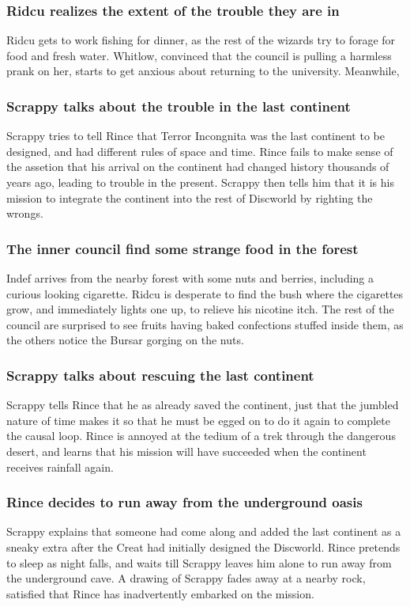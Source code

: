 \subsubsection{\Gls{Ridcu} realizes the extent of the trouble they are in}
\Gls{Ridcu} gets to work fishing for dinner, as the rest of the wizards try to forage for food and
fresh water. \Gls{Whitlow}, convinced that the council is pulling a harmless prank on her, starts to
get anxious about returning to the university. Meanwhile,

\subsubsection{\Gls{Scrappy} talks about the trouble in the last continent}
\Gls{Scrappy} tries to tell \Gls{Rince} that Terror Incongnita was the last continent to be
designed, and had different rules of space and time. \Gls{Rince} fails to make sense of the assetion
that his arrival on the continent had changed history thousands of years ago, leading to trouble in
the present. \Gls{Scrappy} then tells him that it is his mission to integrate the continent into the
rest of Discworld by righting the wrongs.

\subsubsection{The inner council find some strange food in the forest}
\Gls{Indef} arrives from the nearby forest with some nuts and berries, including a curious looking
cigarette. \Gls{Ridcu} is desperate to find the bush where the cigarettes grow, and immediately
lights one up, to relieve his nicotine itch. The rest of the council are surprised to see fruits
having baked confections stuffed inside them, as the others notice the \Gls{Bursar} gorging on the
nuts.

\subsubsection{\Gls{Scrappy} talks about rescuing the last continent}
\Gls{Scrappy} tells \Gls{Rince} that he as already saved the continent, just that the jumbled nature
of time makes it so that he must be egged on to do it again to complete the causal loop. \Gls{Rince}
is annoyed at the tedium of a trek through the dangerous desert, and learns that his mission will
have succeeded when the continent receives rainfall again.

\subsubsection{\Gls{Rince} decides to run away from the underground oasis}
\Gls{Scrappy} explains that someone had come along and added the last continent as a sneaky extra
after the \Gls{Creat} had initially designed the Discworld. \Gls{Rince} pretends to sleep as night
falls, and waits till \Gls{Scrappy} leaves him alone to run away from the underground cave. A
drawing of \Gls{Scrappy} fades away at a nearby rock, satisfied that \Gls{Rince} has inadvertently
embarked on the mission.


